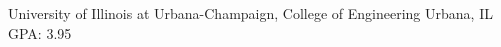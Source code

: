 
        {University of Illinois at Urbana-Champaign, College of Engineering}
        {Urbana, IL}
        {GPA: 3.95}
        {}
